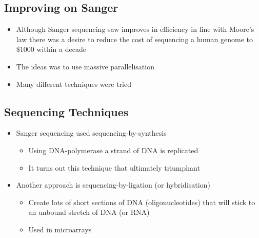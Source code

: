 \Outline %

\begin{slide}
\section{Improving on Sanger}

\begin{PauseHighLight}
  \begin{itemize}
  \item Although Sanger sequencing saw improves in efficiency in line
    with Moore's law there was a desire to reduce the cost of sequencing
    a human genome to \$1000 within a decade\pause
  \item The ideas was to use massive parallelisation\pause
  \item Many different techniques were tried\pause
  \end{itemize}
\end{PauseHighLight}

\end{slide}


\begin{slide}
\section[-2]{Sequencing Techniques}

\begin{PauseHighLight}
  \begin{itemize}
  \item Sanger sequencing used sequencing-by-synthesis\pause
    \begin{itemize}
    \item Using DNA-polymerase a strand of DNA is replicated\pause
    \item It turns out this technique that ultimately triumphant\pause
    \end{itemize}
  \item Another approach is sequencing-by-ligation (or hybridisation)\pause
    \begin{itemize}
    \item Create lots of short sections of DNA (oligonucleotides) that
      will stick to an unbound stretch of DNA (or RNA)\pause
    \item Used in microarrays\pause
    \end{itemize}
  \end{itemize}
\end{PauseHighLight}

\end{slide}

